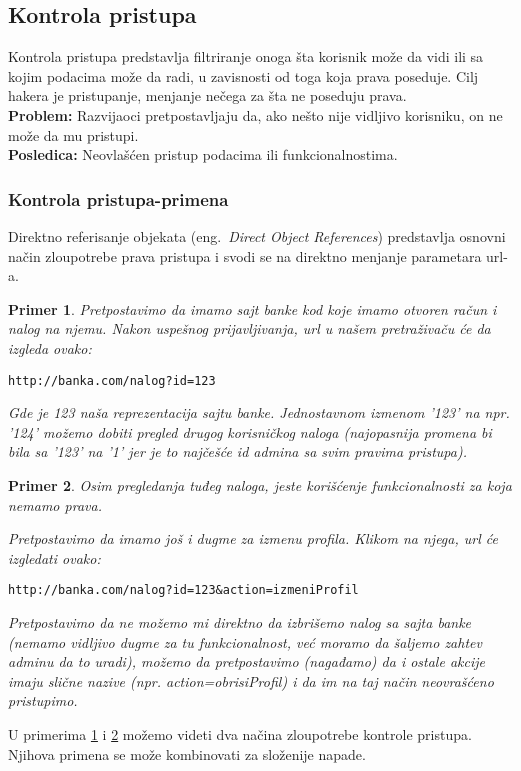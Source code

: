 \documentclass[a4paper]{article}
\newtheorem{primer}{Primer}[section]
\begin{document}
\subsection{Kontrola pristupa}
Kontrola pristupa predstavlja filtriranje onoga \v{s}ta korisnik mo\v{z}e da vidi ili sa kojim podacima mo\v{z}e da radi,  u zavisnosti od toga koja prava poseduje. Cilj hakera je pristupanje, menjanje ne\v{c}ega za \v{s}ta ne poseduju prava.\\
\textbf{Problem:} Razvijaoci pretpostavljaju da, ako ne\v{s}to nije vidljivo korisniku, on ne mo\v{z}e da mu pristupi.\\
\textbf{Posledica:} Neovla\v{s}\'{c}en pristup podacima ili funkcionalnostima.
\subsubsection{Kontrola pristupa-primena}
Direktno referisanje objekata (eng.~{\em Direct Object References}) predstavlja osnovni na\v{c}in zloupotrebe prava pristupa i svodi se na direktno menjanje parametara url-a.
\begin{primer}
\label{primer3}
Pretpostavimo da imamo sajt banke kod koje imamo otvoren ra\v{c}un i nalog na njemu. Nakon uspe\v{s}nog prijavljivanja, url u na\v{s}em pretra\v{z}iva\v{c}u \'{c}e da izgleda ovako:
\begin{lstlisting}
http://banka.com/nalog?id=123
\end{lstlisting}
Gde je 123 na\v{s}a reprezentacija sajtu banke. Jednostavnom izmenom '123' na npr. '124' mo\v{z}emo dobiti pregled drugog korisni\v{c}kog naloga (najopasnija promena bi bila sa '123' na '1' jer je to naj\v{c}e\v{s}\'{c}e id admina sa svim pravima pristupa).
\end{primer}
\begin{primer}
\label{primer4}
Osim pregledanja tuđeg naloga, jeste kori\v{s}\'{c}enje funkcionalnosti za koja nemamo prava.

Pretpostavimo da imamo jo\v{s} i dugme za izmenu profila. Klikom na njega, url \'{c}e izgledati ovako:\\

\begin{lstlisting}
http://banka.com/nalog?id=123&action=izmeniProfil
\end{lstlisting}

Pretpostavimo da ne mo\v{z}emo mi direktno da izbri\v{s}emo nalog sa sajta banke (nemamo vidljivo dugme za tu funkcionalnost, ve\'{c} moramo da \v{s}aljemo zahtev adminu da to uradi), mo\v{z}emo da pretpostavimo (nagađamo) da i ostale akcije imaju sli\v{c}ne nazive (npr. action=obrisiProfil) i da im na taj na\v{c}in neovra\v{s}\'{c}eno pristupimo.\\
\end{primer}
U primerima \ref{primer3} i \ref{primer4} možemo videti dva načina zloupotrebe kontrole pristupa. Njihova primena se može kombinovati za složenije napade.
\end{document}
